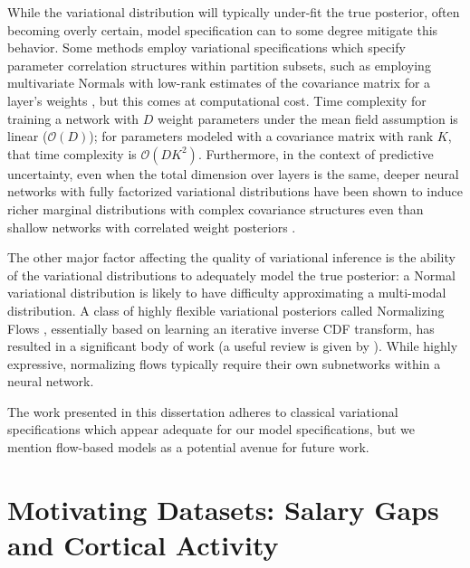 While the variational distribution will typically under-fit the true posterior, often becoming overly certain, model specification can to some degree mitigate this behavior.
Some methods employ variational specifications which specify parameter correlation structures within partition subsets, such as employing multivariate Normals with low-rank estimates of the covariance matrix for a layer's weights \citep{ghosh_structured_2018}, but this comes at computational cost.  Time complexity for training a network with $D$ weight parameters under the mean field assumption is linear ($\mathcal{O}(D)$); for parameters modeled with a covariance matrix with rank $K$, that time complexity is $\mathcal{O}(DK^2)$.  
Furthermore, in the context of predictive uncertainty, even when the total dimension over layers is the same, deeper neural networks with fully factorized variational distributions have been shown to induce richer marginal distributions with complex covariance structures even than shallow networks with correlated weight posteriors \citep{farquhar_liberty_2021}.

The other major factor affecting the quality of variational inference is the ability of the variational distributions to adequately model the true posterior: a Normal variational distribution is likely to have difficulty approximating a multi-modal distribution.  A class of highly flexible variational posteriors called Normalizing Flows \citep{rezende_variational_2015}, essentially based on learning an iterative inverse CDF transform, has resulted in a significant body of work (a useful review is given by \citet{papamakarios_normalizing_2021}).  While highly expressive, normalizing flows typically require their own subnetworks within a neural network.  

The work presented in this dissertation adheres to classical variational specifications which appear adequate for our model specifications, but we mention flow-based models as a potential avenue for future work.



\section{Motivating Datasets: Salary Gaps and Cortical Activity}
\label{sec:intro-datasets}

